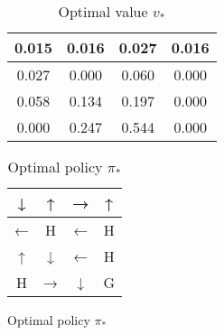 \documentclass{article}
\begin{document}
\begin{figure}[H]
    \begin{minipage}{0.45\textwidth}
    \centering
        \begin{table}[H]
            \centering
            \begin{tabular}{c|c|c|c}
                0.015 & 0.016 & 0.027 & 0.016 \\ \hline
                0.027 & 0.000 & 0.060 & 0.000 \\ \hline
                0.058 & 0.134 & 0.197 & 0.000 \\ \hline
                0.000 & 0.247 & 0.544 & 0.000 \\
            \end{tabular}
            \caption{Optimal value $v_*$}
            \label{tab:table3}  
        \end{table}
    \end{minipage}
    \begin{minipage}{0.45\textwidth}
        \begin{table}[H]
        \centering
        \begin{tabular}{c|c|c|c}
        ↓ &↑& →& ↑ \\ \hline
        ← &H& ←& H \\ \hline
        ↑ &↓& ←& H \\ \hline
        H &→& ↓& G
        \end{tabular}
        \caption{Optimal policy $\pi_*$}
        \label{tab:pi_star}
        \end{table}
    \end{minipage}
\end{figure}
\end{document}
